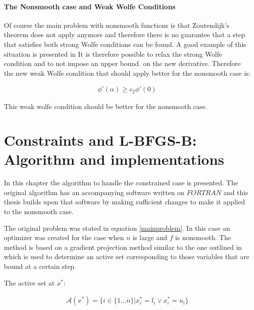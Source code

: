\subsubsection{The Nonsmooth case and Weak Wolfe Conditions}

Of course the main problem with nonsmooth functions is that Zoutendijk's theorem does not apply anymore and therefore there is no guarantee that a step that satisfies both strong Wolfe conditions can be found.  A good example of this situation is presented in \citep{skaaja}  It is therefore possible to relax the strong Wolfe condition and to not impose an upper bound.  on the new derivative.  Therefore the new weak Wolfe condition that should apply better for the nonsmooth case is: 

\begin{equation} \label{weakWolfe}
  \begin{aligned}
    \phi'(\alpha) \geq c_2\phi'(0)
  \end{aligned}
\end{equation}

This weak wolfe condition should be better for the nonsmooth case.

\chapter{Constraints and L-BFGS-B: Algorithm and implementations}
\label{ChapterConstraints} %

In this chapter the algorithm to handle the constrained case is presented.  The original algorithm \citep{mainpaper} has an accompanying software written on $FORTRAN$ and this thesis builds upon that software by making sufficient changes to make it applied to the nonsmooth case.

The original problem was stated in equation \ref{mainproblem}.  In this case an optimizer was created for the case when $n$ is large and $f$ is nonsmooth.  The method is based on a gradient projection method similar to the one outlined in \citep{gradproj1, gradproj2} which is used to determine an active set corresponding to those variables that are bound at a certain step.  

The active set at $x^*$:

\begin{equation}
  \begin{aligned}
    \mathcal{A}(x^*) = \{ i \in \{1 \ldots n\} |  x^*_i = l_i \vee  x^*_i = u_i\}
  \end{aligned}
\end{equation}

